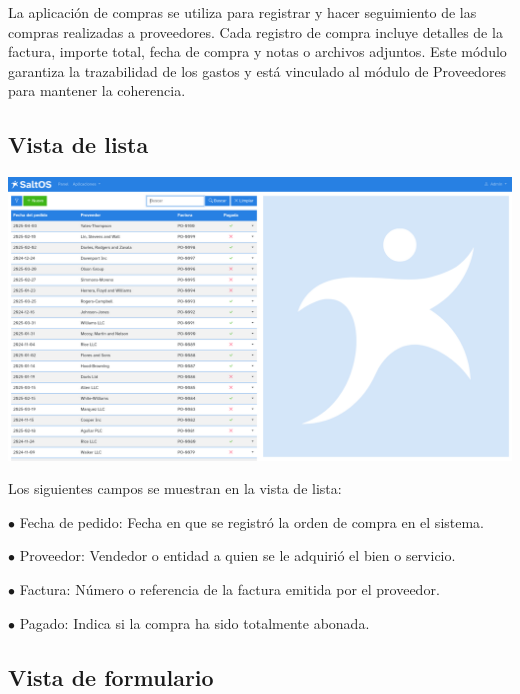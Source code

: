 \documentclass[a4paper]{article}
\begin{document}
La aplicación de compras se utiliza para registrar y hacer seguimiento de las compras realizadas a proveedores.
Cada registro de compra incluye detalles de la factura, importe total, fecha de compra y notas o archivos adjuntos.
Este módulo garantiza la trazabilidad de los gastos y está vinculado al módulo de Proveedores para mantener la coherencia.

\hypertarget{toc118}{}
\subsection{Vista de lista}

\begin{center}\includegraphics[width=1\textwidth]{../ujest/snaps/test-screenshots-js-screenshots-purchases-purchase-list-es-es-1-snap.png}\end{center}

Los siguientes campos se muestran en la vista de lista:

\begin{compactitem}
\item[\color{myblue}$\bullet$] Fecha de pedido: Fecha en que se registró la orden de compra en el sistema.
\item[\color{myblue}$\bullet$] Proveedor: Vendedor o entidad a quien se le adquirió el bien o servicio.
\item[\color{myblue}$\bullet$] Factura: Número o referencia de la factura emitida por el proveedor.
\item[\color{myblue}$\bullet$] Pagado: Indica si la compra ha sido totalmente abonada.
\end{compactitem}

\hypertarget{toc119}{}
\subsection{Vista de formulario}
\end{document}
